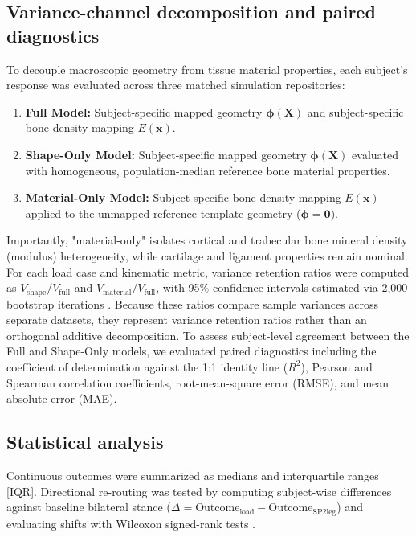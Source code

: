 \subsection{Variance-channel decomposition and paired diagnostics}
To decouple macroscopic geometry from tissue material properties, each subject's response was evaluated across three matched simulation repositories:
\begin{enumerate}
\item \textbf{Full Model:} Subject-specific mapped geometry $\boldsymbol{\phi}(\mathbf{X})$ and subject-specific bone density mapping $E(\mathbf{x})$.
\item \textbf{Shape-Only Model:} Subject-specific mapped geometry $\boldsymbol{\phi}(\mathbf{X})$ evaluated with homogeneous, population-median reference bone material properties.
\item \textbf{Material-Only Model:} Subject-specific bone density mapping $E(\mathbf{x})$ applied to the unmapped reference template geometry ($\boldsymbol{\phi} = \mathbf{0}$).
\end{enumerate}
Importantly, "material-only" isolates cortical and trabecular bone mineral density (modulus) heterogeneity, while cartilage and ligament properties remain nominal. For each load case and kinematic metric, variance retention ratios were computed as $V_{\text{shape}} / V_{\text{full}}$ and $V_{\text{material}} / V_{\text{full}}$, with 95\% confidence intervals estimated via 2,000 bootstrap iterations \citep{EfronTibshirani1994}. Because these ratios compare sample variances across separate datasets, they represent variance retention ratios rather than an orthogonal additive decomposition. To assess subject-level agreement between the Full and Shape-Only models, we evaluated paired diagnostics including the coefficient of determination against the 1:1 identity line ($R^2$), Pearson and Spearman correlation coefficients, root-mean-square error (RMSE), and mean absolute error (MAE).

\subsection{Statistical analysis}
Continuous outcomes were summarized as medians and interquartile ranges [IQR]. Directional re-routing was tested by computing subject-wise differences against baseline bilateral stance ($\Delta = \text{Outcome}_{\text{load}} - \text{Outcome}_{\text{SP2leg}}$) and evaluating shifts with Wilcoxon signed-rank tests \citep{Wilcoxon1945}.


